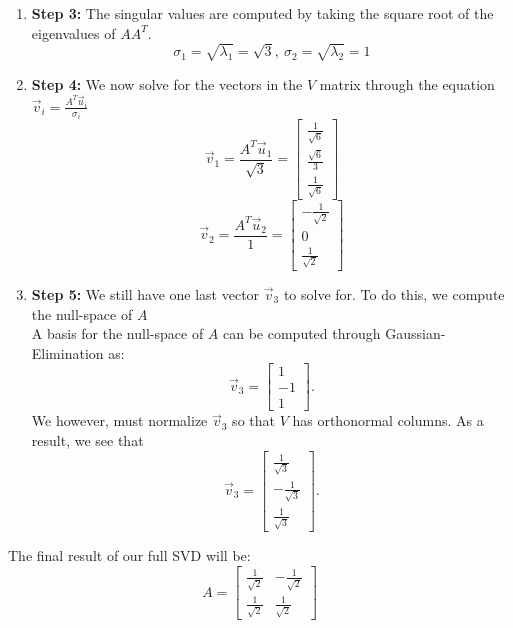 \begin{enumerate}
{\begin{enumerate}[label=(\roman*)]
        A basis for the null-space of $AA^{T} - I$ is:
        $$\vec{u}_{2} = \begin{bmatrix} -\frac{1}{\sqrt{2}} \\ \frac{1}{\sqrt{2}} \end{bmatrix}$$
        Remember that these vectors form the $U$ matrix.
      \item \textbf{Step 3:}
        The singular values are computed by taking the square root of the eigenvalues of $AA^{T}.$
        $$\sigma_{1} = \sqrt{\lambda_{1}} = \sqrt{3}, \ \sigma_{2} = \sqrt{\lambda_{2}} = 1$$
      \item \textbf{Step 4:}
        We now solve for the vectors in the $V$ matrix through the equation $\vec{v}_i = \frac{A^{T} \vec{u}_i}{\sigma_i}$
        $$\vec{v}_{1} = \frac{A^{T} \vec{u}_{1}}{\sqrt{3}} = 
        \begin{bmatrix} \frac{1}{\sqrt{6}} \\ \frac{\sqrt{6}}{3} \\ \frac{1}{\sqrt{6}} \end{bmatrix}$$
        $$\vec{v}_{2} = \frac{A^{T} \vec{u}_{2}}{1} = 
        \begin{bmatrix} -\frac{1}{\sqrt{2}} \\ 0 \\ \frac{1}{\sqrt{2}} \end{bmatrix}$$
      \item \textbf{Step 5:}
        We still have one last vector $\vec{v}_{3}$ to solve for. To do this, we compute the null-space of $A$ \\
        A basis for the null-space of $A$ can be computed through Gaussian-Elimination as:
        $$\vec{v}_{3} = \begin{bmatrix} 1 \\ -1 \\ 1 \end{bmatrix}.$$
        We however, must normalize $\vec{v}_{3}$ so that $V$ has orthonormal columns. As a result, we see that
        $$\vec{v}_{3} = \begin{bmatrix} \frac{1}{\sqrt{3}} \\ - \frac{1}{\sqrt{3}} \\ \frac{1}{\sqrt{3}} \end{bmatrix}.$$
    \end{enumerate}
    The final result of our full SVD will be:
    \begin{equation}
      A = \begin{bmatrix} \frac{1}{\sqrt{2}} & -\frac{1}{\sqrt{2}} \\ \frac{1}{\sqrt{2}} & \frac{1}{\sqrt{2}} \end{bmatrix} 

\end{equation}}
\end{enumerate}
